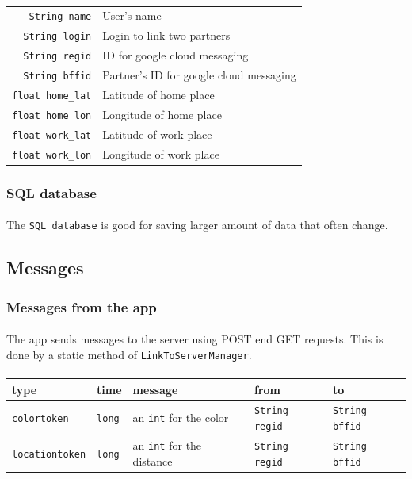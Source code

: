 \documentclass[12pt]{article}
\begin{document}
\paragraph{}
\begin{tabular}{rl}
	\verb?String name? & User's name \\
	\verb?String login? & Login to link two partners \\
	\verb?String regid? & ID for google cloud messaging \\
	\verb?String bffid? & Partner's ID for google cloud messaging\\
	\verb?float home_lat? & Latitude of home place \\
	\verb?float home_lon? & Longitude of home place \\
	\verb?float work_lat? & Latitude of work place \\
	\verb?float work_lon? & Longitude of work place \\
\end{tabular}

\subsubsection{SQL database}
\paragraph{}The \verb?SQL database? is good for saving larger amount of data that often change.





\subsection{Messages}
\subsubsection{Messages from the app}
\paragraph{}The app sends messages to the server using POST end GET requests. This is done by a static method of \verb?LinkToServerManager?.
\paragraph{}
\begin{tabular}{l|l|l|l|l}
type & time & message & from & to \\
\hline
\hline
\verb?colortoken? & \verb?long? & an \verb?int? for the color & \verb?String regid? & \verb?String bffid? \\
\verb?locationtoken? & \verb?long? & an \verb?int? for the distance & \verb?String regid? & \verb?String bffid? \\
\end{tabular}
\end{document}
